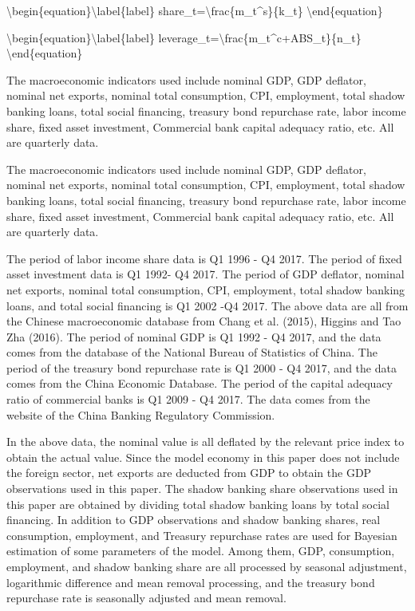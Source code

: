 \documentclass[10pt,math=newtx,citestyle=gb7714-2015,bibstyle=gb7714-2015]{elegantbook}
\begin{document}
	\textbackslash{}begin\{equation\}\textbackslash{}label\{label\}
	share\_t=\textbackslash{}frac\{m\_t\^{}s\}\{k\_t\}
	\textbackslash{}end\{equation\}
	
	\textbackslash{}begin\{equation\}\textbackslash{}label\{label\}
	leverage\_t=\textbackslash{}frac\{m\_t\^{}c+ABS\_t\}\{n\_t\}
	\textbackslash{}end\{equation\}
	
	The macroeconomic indicators used include nominal GDP, GDP deflator, nominal net exports, nominal total consumption, CPI, employment, total shadow banking loans, total social financing, treasury bond repurchase rate, labor income share, fixed asset investment, Commercial bank capital adequacy ratio, etc. All are quarterly data.
	
	The macroeconomic indicators used include nominal GDP, GDP deflator, nominal net exports, nominal total consumption, CPI, employment, total shadow banking loans, total social financing, treasury bond repurchase rate, labor income share, fixed asset investment, Commercial bank capital adequacy ratio, etc. All are quarterly data.
	
	The period of labor income share data is Q1 1996 - Q4 2017. The period of fixed asset investment data is Q1 1992- Q4 2017. The period of GDP deflator, nominal net exports, nominal total consumption, CPI, employment, total shadow banking loans, and total social financing is Q1 2002 -Q4 2017. The above data are all from the Chinese macroeconomic database from Chang et al. (2015), Higgins and Tao Zha (2016). The period of nominal GDP is Q1 1992 - Q4 2017, and the data comes from the database of the National Bureau of Statistics of China. The period of the treasury bond repurchase rate is Q1 2000 - Q4 2017, and the data comes from the China Economic Database. The period of the capital adequacy ratio of commercial banks is Q1 2009 - Q4 2017. The data comes from the website of the China Banking Regulatory Commission.
	
	In the above data, the nominal value is all deflated by the relevant price index to obtain the actual value. Since the model economy in this paper does not include the foreign sector, net exports are deducted from GDP to obtain the GDP observations used in this paper. The shadow banking share observations used in this paper are obtained by dividing total shadow banking loans by total social financing. In addition to GDP observations and shadow banking shares, real consumption, employment, and Treasury repurchase rates are used for Bayesian estimation of some parameters of the model. Among them, GDP, consumption, employment, and shadow banking share are all processed by seasonal adjustment, logarithmic difference and mean removal processing, and the treasury bond repurchase rate is seasonally adjusted and mean removal.
	
\end{document}
